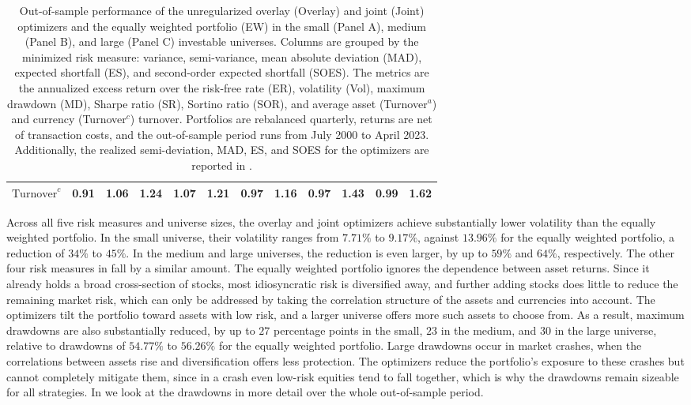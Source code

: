 \begin{table}[tbp]
{\begin{tabular}{l*{11}{c}}
    $\text{Turnover}^c$      & 0.91             & 1.06             & 1.24             & 1.07             & 1.21             & 0.97             & 1.16             & 0.97             & 1.43             & 0.99             & 1.62 \\
    \bottomrule
  \end{tabular}%
}
  \caption{Out-of-sample performance of the unregularized overlay (Overlay) and joint (Joint) optimizers and the equally weighted portfolio (EW) in the small (Panel A), medium (Panel B), and large (Panel C) investable universes. Columns are grouped by the minimized risk measure: variance, semi-variance, mean absolute deviation (MAD), expected shortfall (ES), and second-order expected shortfall (SOES). The metrics are the annualized excess return over the risk-free rate (ER), volatility (Vol), maximum drawdown (MD), Sharpe ratio (SR), Sortino ratio (SOR), and average asset (Turnover$^a$) and currency (Turnover$^c$) turnover. Portfolios are rebalanced quarterly, returns are net of transaction costs, and the out-of-sample period runs from July 2000 to April 2023. Additionally, the realized semi-deviation, MAD, ES, and SOES for the optimizers are reported in .}
  \label{tab:baseline}
\end{table}

Across all five risk measures and universe sizes, the overlay and joint optimizers achieve substantially lower
volatility than the equally weighted portfolio. In the small universe, their volatility ranges from $7.71\%$ to $9.17\%$,
against $13.96\%$ for the equally weighted portfolio, a reduction of $34\%$ to $45\%$. In the medium and large 
universes, the reduction is even larger, by up to $59\%$ and $64\%$, respectively. The other four risk measures in
 fall by a similar amount.
The equally weighted portfolio ignores the dependence between asset returns.
Since it already holds a broad cross-section of stocks, most idiosyncratic
risk is diversified away, and further adding stocks does little to reduce
the remaining market risk, which can only be addressed by
taking the correlation structure of the assets and currencies into account. The optimizers tilt the portfolio
toward assets with low risk, and a larger universe offers more such
assets to choose from. As a result, maximum drawdowns are
also substantially reduced, by up to $27$ percentage points in the small, $23$ in the medium, and $30$ in
the large universe, relative to drawdowns of $54.77\%$ to $56.26\%$ for the equally weighted portfolio.  Large drawdowns occur
in market crashes, when the correlations between assets rise and diversification offers less protection. The optimizers reduce the portfolio's exposure to these 
crashes but cannot completely mitigate them, since in a crash even low-risk equities tend to fall together, 
which is why the drawdowns remain sizeable for all strategies. In  
we look at the drawdowns in more detail over the whole out-of-sample period.

